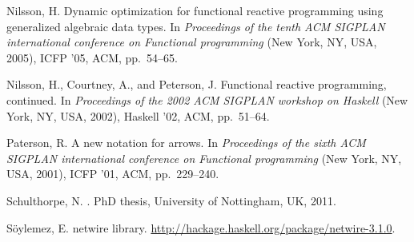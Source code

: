 \documentclass[letterpaper]{article}
\begin{document}
\begin{thebibliography}{10}
{\sc Nilsson, H.}
\newblock Dynamic optimization for functional reactive programming using
  generalized algebraic data types.
\newblock In {\em Proceedings of the tenth ACM SIGPLAN international conference
  on Functional programming\/} (New York, NY, USA, 2005), ICFP '05, ACM,
  pp.~54--65.

{\sc Nilsson, H., Courtney, A., and Peterson, J.}
\newblock Functional reactive programming, continued.
\newblock In {\em Proceedings of the 2002 ACM SIGPLAN workshop on Haskell\/}
  (New York, NY, USA, 2002), Haskell '02, ACM, pp.~51--64.

{\sc Paterson, R.}
\newblock A new notation for arrows.
\newblock In {\em Proceedings of the sixth ACM SIGPLAN international conference
  on Functional programming\/} (New York, NY, USA, 2001), ICFP '01, ACM,
  pp.~229--240.

{\sc Schulthorpe, N.}
.
\newblock PhD thesis, University of Nottingham, UK, 2011.

{\sc S\"{o}ylemez, E.}
\newblock netwire library.
\newblock \mbox{\url{http://hackage.haskell.org/package/netwire-3.1.0}}.

\end{thebibliography}
\end{document}
